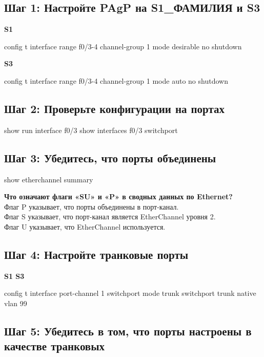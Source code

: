 \subsection{Шаг 1: Настройте PAgP на S1_ФАМИЛИЯ и S3}
\textbf{S1}

config t
interface range f0/3-4
channel-group 1 mode desirable
no shutdown

\textbf{S3}

config t
interface range f0/3-4
channel-group 1 mode auto
no shutdown

\subsection{Шаг 2: Проверьте конфигурации на портах}

show run interface f0/3
show interfaces f0/3 switchport

\subsection{Шаг 3: Убедитесь, что порты объединены}

show etherchannel summary

\textbf{Что означают флаги «SU» и «P» в сводных данных по Ethernet?}\\
Флаг P указывает, что порты объединены в порт-канал.\\
Флаг S указывает, что порт-канал является EtherChannel уровня 2.\\
Флаг U указывает, что EtherChannel используется.\\

\subsection{Шаг 4: Настройте транковые порты}

\textbf{S1 S3}

config t
interface port-channel 1
switchport mode trunk
switchport trunk native vlan 99

\subsection{Шаг 5: Убедитесь в том, что порты настроены в качестве транковых}

